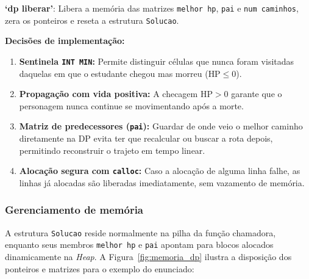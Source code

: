 \documentclass[12pt,a4paper]{article}
\makeatletter
\DeclareRobustCommand{\_}{%
  \ifmmode
    \nfss@text{\textunderscore}%
  \else
    \textunderscore\allowbreak
  \fi
}
\makeatother
\begin{document}
\textbf{`dp\_liberar'}: Libera a memória das matrizes \texttt{melhor\_hp}, \texttt{pai} e \texttt{num\_caminhos}, zera os ponteiros e reseta a estrutura \texttt{Solucao}.

\textbf{Decisões de implementação:}
\begin{enumerate}
    \item \textbf{Sentinela \texttt{INT\_MIN}:} Permite distinguir células que nunca foram visitadas daquelas em que o estudante chegou mas morreu ($\text{HP} \le 0$).
    \item \textbf{Propagação com vida positiva:} A checagem $\text{HP} > 0$ garante que o personagem nunca continue se movimentando após a morte.
    \item \textbf{Matriz de predecessores (\texttt{pai}):} Guardar de onde veio o melhor caminho diretamente na DP evita ter que recalcular ou buscar a rota depois, permitindo reconstruir o trajeto em tempo linear.
    \item \textbf{Alocação segura com \texttt{calloc}:} Caso a alocação de alguma linha falhe, as linhas já alocadas são liberadas imediatamente, sem vazamento de memória.
\end{enumerate}

\subsubsection*{Gerenciamento de memória}

A estrutura \texttt{Solucao} reside normalmente na pilha da função chamadora, enquanto seus membros \texttt{melhor\_hp} e \texttt{pai} apontam para blocos alocados dinamicamente na \textit{Heap}. A Figura~\ref{fig:memoria_dp} ilustra a disposição dos ponteiros e matrizes para o exemplo do enunciado:
\end{document}

